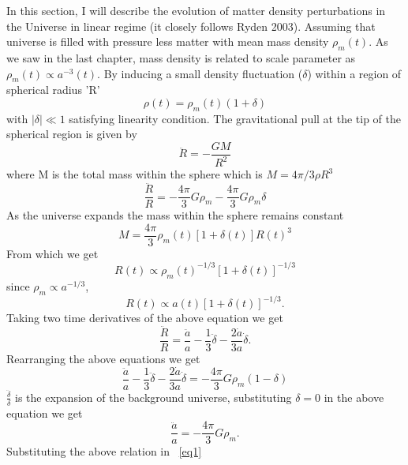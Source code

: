 In this section, I will describe the evolution of matter density perturbations in the Universe in linear regime (it closely follows Ryden 2003).
Assuming that universe is filled with pressure less matter with mean mass density $\rho_{m}(t)$. 
As we saw in the last chapter, mass density is related to scale parameter as $\rho_{m}(t) \propto a^{-3}(t)$. 
By inducing a small density fluctuation ($\delta$) within a region of spherical radius 'R'
\begin{equation}
\rho(t) = \rho_{m}(t)(1+\delta)
\end{equation}
with $|\delta| \ll 1$ satisfying linearity condition. The gravitational pull at the tip of the spherical region is given by 
\begin{equation}
\ddot{R} = -\frac{GM}{R^{2}}
\end{equation} 
where M is the total mass within the sphere which is $M = 4 \pi /3 \rho R^{3}$
\begin{equation}
\frac{\ddot{R}}{R}= -\frac{4\pi}{3} G\rho_{m} - \frac{4\pi}{3} G \rho_{m} \delta 
\end{equation}
As the universe expands the mass within the sphere remains constant
\begin{equation}
M = \frac{4\pi}{3} \rho_{m}(t)[1+\delta(t)]R(t)^{3}
\end{equation}
From which we get 
\begin{equation}
R(t) \propto \rho_{m}(t)^{-1/3}[1+\delta(t)]^{-1/3}
\end{equation}
since $\rho_{m} \propto a^{-1/3}$,
\begin{equation}
R(t) \propto a(t)[1+\delta(t)]^{-1/3}.
\end{equation}
Taking two time derivatives of the above equation we get
\begin{equation}
\frac{\ddot{R}}{R}  = \frac{\ddot{a}}{a} - \frac{1}{3}\ddot{\delta} - \frac{2\dot{a}}{3a} \dot{\delta} .
\end{equation}
Rearranging the above equations we get 
\begin{equation}
\frac{\ddot{a}}{a} - \frac{1}{3}\ddot{\delta} - \frac{2\dot{a}}{3a} \dot{\delta} = -\frac{4 \pi}{3} G\rho_{m} (1-\delta)
\label{eq1}
\end{equation}
$\frac{\ddot{\delta}}{\delta}$ is the expansion of the background universe, substituting $\delta = 0$ in the above equation we get
\begin{equation}
\frac{\ddot{a}}{a}  = -\frac{4 \pi}{3} G\rho_{m}.
\end{equation}
Substituting the above relation in ~\ref{eq1}
